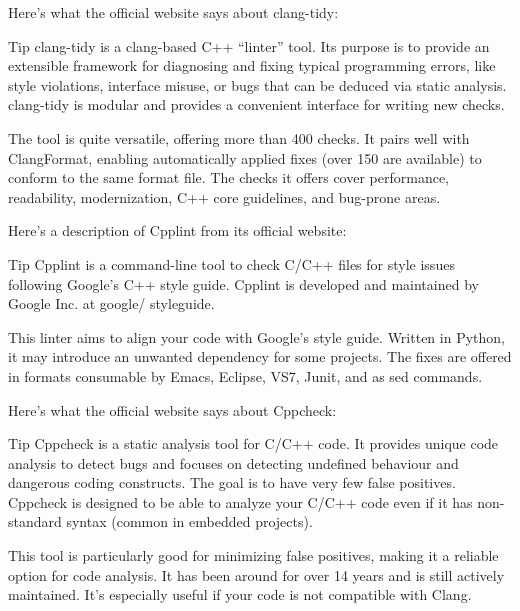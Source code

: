 
Here’s what the official website says about clang-tidy:

\begin{myTip}{Tip}
clang-tidy is a clang-based C++ “linter” tool. Its purpose is to provide an extensible framework for diagnosing and fixing typical programming errors, like style violations, interface misuse, or bugs that can be deduced via static analysis. clang-tidy is modular and provides a convenient interface for writing new checks.
\end{myTip}

The tool is quite versatile, offering more than 400 checks. It pairs well with ClangFormat, enabling automatically applied fixes (over 150 are available) to conform to the same format file. The checks it offers cover performance, readability, modernization, C++ core guidelines, and bug-prone areas.


Here’s a description of Cpplint from its official website:

\begin{myTip}{Tip}
Cpplint is a command-line tool to check C/C++ files for style issues following Google’s C++ style guide. Cpplint is developed and maintained by Google Inc. at google/ styleguide.
\end{myTip}

This linter aims to align your code with Google’s style guide. Written in Python, it may introduce an unwanted dependency for some projects. The fixes are offered in formats consumable by Emacs, Eclipse, VS7, Junit, and as sed commands.


Here’s what the official website says about Cppcheck:

\begin{myTip}{Tip}
Cppcheck is a static analysis tool for C/C++ code. It provides unique code analysis to detect bugs and focuses on detecting undefined behaviour and dangerous coding constructs. The goal is to have very few false positives. Cppcheck is designed to be able to analyze your C/C++ code even if it has non-standard syntax (common in embedded projects).
\end{myTip}

This tool is particularly good for minimizing false positives, making it a reliable option for code analysis. It has been around for over 14 years and is still actively maintained. It’s especially useful if your code is not compatible with Clang.

